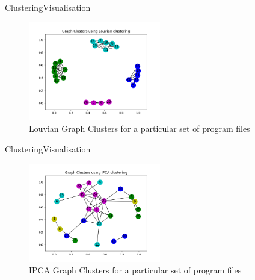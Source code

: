 \documentclass{beamer}
\begin{document}
\begin{frame}{Clustering}{Visualisation}
     \begin{figure}[H]
            \centering
            \includegraphics[height=1.7in]{cluster_louvian_1.png}
            \caption*{Louvian Graph Clusters for a particular set of program files}
     \end{figure}
\end{frame}
\begin{frame}{Clustering}{Visualisation}
     \begin{figure}
         \centering
         \includegraphics[height=1.7in]{cluster_IPCA_1.png}
         \caption*{IPCA Graph Clusters for a particular set of program files}
     \end{figure}
\end{frame}
\end{document}
